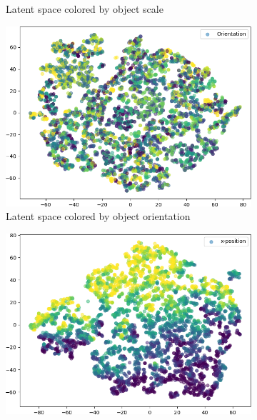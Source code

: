 \begin{figure}
\begin{adjustbox}{valign=T}
\begin{subfigure}{.19\textwidth}
            \caption{Latent space colored by object scale}
            \label{subfig:vae_embedding_dsprites_scale}
        \end{subfigure}
    \end{adjustbox}
    \hfill
    \begin{adjustbox}{valign=T}
        \begin{subfigure}{.19\textwidth}
            \includegraphics[width=\textwidth]{images/latent_spaces/dsprites/vae/embeddings_mu_2.png}
            \caption{Latent space colored by object orientation}
            \label{subfig:vae_embedding_dsprites_orientation}
        \end{subfigure}
    \end{adjustbox}
    \hfill
    \begin{adjustbox}{valign=T}
        \begin{subfigure}{.19\textwidth}
            \includegraphics[width=\textwidth]{images/latent_spaces/dsprites/vae/embeddings_mu_3.png}

\end{subfigure}
\end{adjustbox}
\end{figure}
